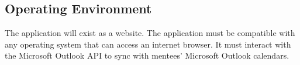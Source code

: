 \subsection{Operating Environment}

The application will exist as a website. The application must be compatible with
any operating system that can access an internet browser. It must interact with
the Microsoft Outlook API to sync with mentees' Microsoft Outlook calendars.
